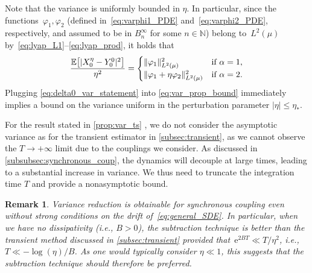 \documentclass[11pt]{article}
\newcommand{\E}{\mathbb{E}}
\newcommand{\N}{\mathbb{N}}
\newcommand{\e}{\mathrm{e}}
\renewcommand{\leq}{\leqslant}
\DeclarePairedDelimiter\abs{\lvert}{\rvert}
\DeclarePairedDelimiter\norm{\lVert}{\rVert}
\DeclarePairedDelimiter\bkt{\lbrack}{\rbrack}
\newtheorem{remark}{Remark}
\theoremstyle{definition}
\begin{document}
Note that the variance is uniformly bounded in $\eta$. In particular, since the functions~$\varphi_1,\varphi_2$ (defined in~\eqref{eq:varphi1_PDE} and~\eqref{eq:varphi2_PDE}, respectively, and assumed to be in $B^\infty_n$ for some $n\in\N$) belong to~$L^2(\mu)$ by~\eqref{eq:lyap_L1}--\eqref{eq:lyap_prod}, it holds that
\begin{equation}
	\frac{\E\bkt*{\abs{X_0^\eta - Y_0^0}^2}}{\eta^2} = 
	\begin{cases}
		\norm{\varphi_1}^2_{L^2(\mu)} &\text{if }\alpha = 1, \\
		\norm{\varphi_1 + \eta\varphi_2}^2_{L^2(\mu)} &\text{if }\alpha = 2.
	\end{cases}
\label{eq:delta0_var_statement}
\end{equation}
Plugging \eqref{eq:delta0_var_statement} into \eqref{eq:var_prop_bound} immediately implies a bound on the variance uniform in the perturbation parameter $|\eta| \leq \eta_*$.

For the result stated in \cref{prop:var_ts} , we do not consider the asymptotic variance as for the transient estimator in \cref{subsec:transient}, as we cannot observe the $T\to+\infty$ limit due to the couplings we consider. As discussed in \cref{subsubsec:synchronous_coup}, the dynamics will decouple at large times, leading to a substantial increase in variance. We thus need to truncate the integration time $T$ and provide a nonasymptotic bound.

\begin{remark}
Variance reduction is obtainable for synchronous coupling even without strong conditions on the drift of~\eqref{eq:general_SDE}. In particular, when we have no dissipativity (i.e., $B>0$), the subtraction technique is better than the transient method discussed in \cref{subsec:transient} provided that~$\e^{2BT} \ll T/\eta^2$, i.e., $T\ll -\log(\eta)/B$. As one would typically consider $\eta\ll 1$, this suggests that the subtraction technique should therefore be preferred. 
\end{remark}
\end{document}
